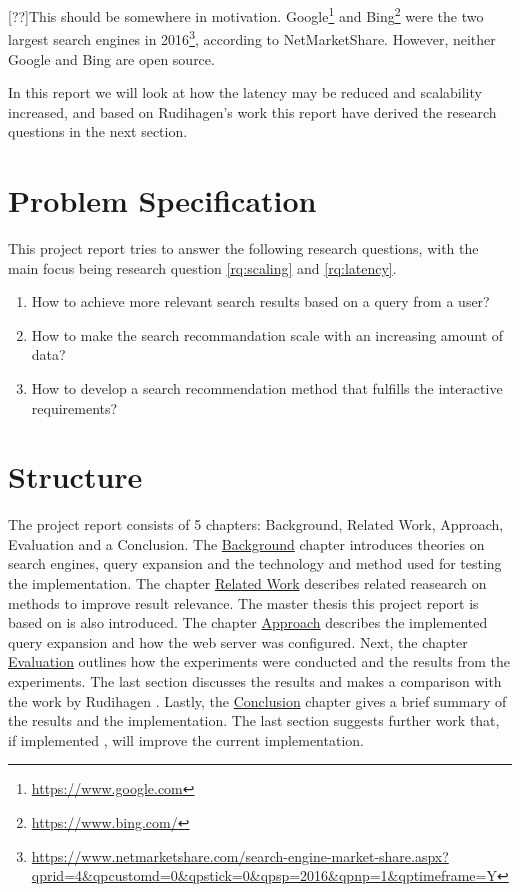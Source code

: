 [??]This should be somewhere in motivation.
Google\footnote{\url{https://www.google.com}} and Bing\footnote{\url{https://www.bing.com/}}
were the two largest search engines in 2016\footnote{\url{https://www.netmarketshare.com/search-engine-market-share.aspx?qprid=4&qpcustomd=0&qpstick=0&qpsp=2016&qpnp=1&qptimeframe=Y}},
according to NetMarketShare.
However, neither Google and Bing are open source.

In this report we will look at how the latency may be reduced and scalability increased,
and based on Rudihagen's work this report have derived the research questions in the next section.

\section{Problem Specification}
\label{sec:problem-specification}
This project report tries to answer the following research questions, with the main focus being research question \ref{rq:scaling} and \ref{rq:latency}.

\begin{enumerate}
  \item How to achieve more relevant search results based on a query from a user?
  \item\label{rq:scaling} How to make the search recommandation scale with an increasing amount of data?
  \item\label{rq:latency} How to develop a search recommendation method that fulfills the interactive requirements?
\end{enumerate}

\section{Structure}
The project report consists of 5 chapters: Background, Related Work, Approach, Evaluation and a Conclusion.
The \hyperref[ch:background]{Background} chapter introduces theories on search engines,
query expansion and the technology and method used for testing the implementation.
The chapter \hyperref[ch:related-work]{Related Work} describes related reasearch on methods to improve result relevance.
The master thesis this project report is based on is also introduced.
The chapter \hyperref[ch:approach]{Approach} describes the implemented query expansion and how the web server was configured.
Next, the chapter \hyperref[ch:evaluation]{Evaluation} outlines how the experiments were conducted and the results from the experiments.
The last section discusses the results and makes a comparison with the work by Rudihagen \cite{master-thesis}.
Lastly, the \hyperref[ch:conclusion]{Conclusion} chapter gives a brief summary of the results and the implementation.
The last section suggests further work that, if implemented , will improve the current implementation.
